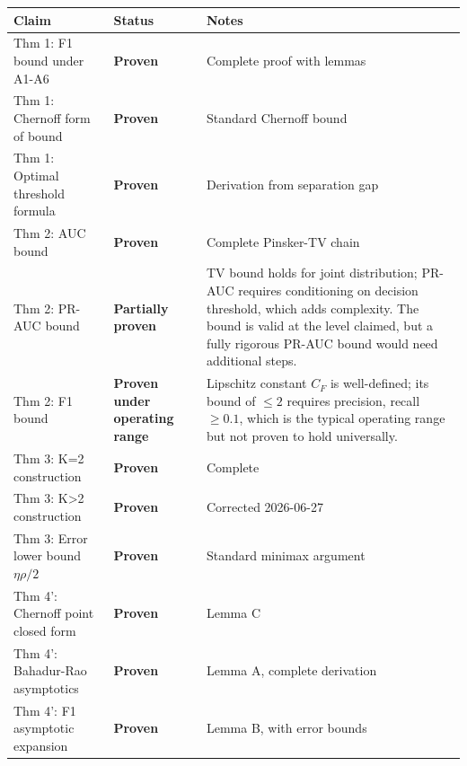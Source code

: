 \documentclass[
  12pt,
]{ctexart}
\begin{document}
\begin{longtable}[]{@{}
  >{\raggedright\arraybackslash}p{}
  >{\raggedright\arraybackslash}p{}
  >{\raggedright\arraybackslash}p{}@{}}
\toprule\noalign{}
\begin{minipage}[b]{\linewidth}\raggedright
Claim
\end{minipage} & \begin{minipage}[b]{\linewidth}\raggedright
Status
\end{minipage} & \begin{minipage}[b]{\linewidth}\raggedright
Notes
\end{minipage} \\
\midrule\noalign{}
\endhead
\bottomrule\noalign{}
\endlastfoot
Thm 1: F1 bound under A1-A6 & \textbf{Proven} & Complete proof with
lemmas \\
Thm 1: Chernoff form of bound & \textbf{Proven} & Standard Chernoff
bound \\
Thm 1: Optimal threshold formula & \textbf{Proven} & Derivation from
separation gap \\
Thm 2: AUC bound & \textbf{Proven} & Complete Pinsker-TV chain \\
Thm 2: PR-AUC bound & \textbf{Partially proven} & TV bound holds for
joint distribution; PR-AUC requires conditioning on decision threshold,
which adds complexity. The bound is valid at the level claimed, but a
fully rigorous PR-AUC bound would need additional steps. \\
Thm 2: F1 bound & \textbf{Proven under operating range} & Lipschitz
constant \(C_F\) is well-defined; its bound of \(\leq 2\) requires
precision, recall \(\geq 0.1\), which is the typical operating range but
not proven to hold universally. \\
Thm 3: K=2 construction & \textbf{Proven} & Complete \\
Thm 3: K\textgreater2 construction & \textbf{Proven} & Corrected
2026-06-27 \\
Thm 3: Error lower bound \(\eta\rho/2\) & \textbf{Proven} & Standard
minimax argument \\
Thm 4': Chernoff point closed form & \textbf{Proven} & Lemma C \\
Thm 4': Bahadur-Rao asymptotics & \textbf{Proven} & Lemma A, complete
derivation \\
Thm 4': F1 asymptotic expansion & \textbf{Proven} & Lemma B, with error
bounds \\

\end{longtable}
\end{document}
